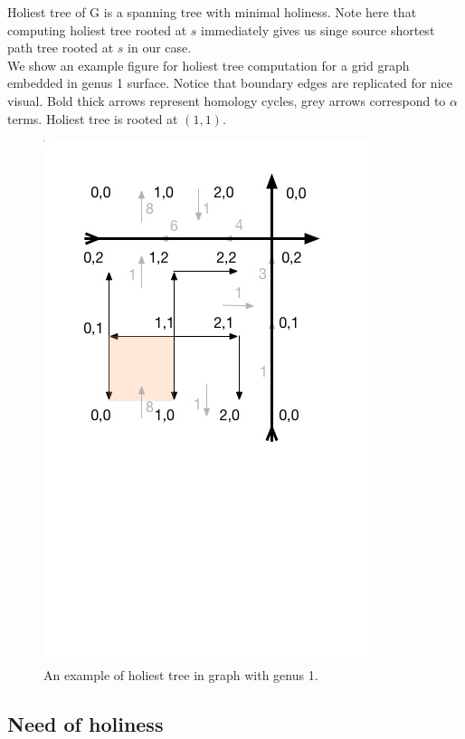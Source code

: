\documentclass{article}
\begin{document}
Holiest tree of G is a spanning tree with minimal holiness. Note here that computing holiest tree rooted at $s$ immediately gives us singe
source shortest path tree rooted at $s$ in our case. \\

We show an example figure for holiest tree computation for a grid graph 
embedded in genus 1 surface. Notice that boundary edges are replicated for nice 
visual. Bold thick arrows represent homology cycles, grey arrows correspond to 
$\alpha$ terms. Holiest tree is rooted at $(1, 1)$. 

\begin{figure}[H]
  \label{fig: g1}
  \centering
  \includegraphics[scale = 0.55]{figures/g1.jpg}
  \vspace{-3.5cm} %
  \caption{An example of holiest tree in graph with genus 1.}
\end{figure}

\subsection{Need of holiness}
\end{document}
